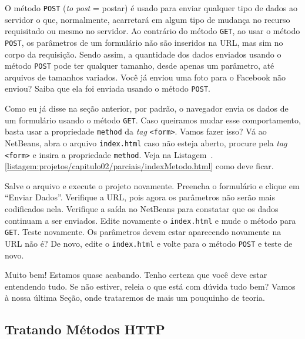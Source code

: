 O método \texttt{POST} (\textit{to post} = postar) é usado para enviar qualquer tipo de dados ao servidor o que, normalmente, acarretará em algum tipo de mudança no recurso requisitado ou mesmo no servidor. Ao contrário do método \texttt{GET}, ao usar o método \texttt{POST}, os parâmetros de um formulário não são inseridos na URL, mas sim no corpo da requisição. Sendo assim, a quantidade dos dados enviados usando o método \texttt{POST} pode ter qualquer tamanho, desde apenas um parâmetro, até arquivos de tamanhos variados. Você já enviou uma foto para o Facebook não enviou? Saiba que ela foi enviada usando o método \texttt{POST}.

Como eu já disse na seção anterior, por padrão, o navegador envia os dados de um formulário usando o método \texttt{GET}. Caso queiramos mudar esse comportamento, basta usar a propriedade \texttt{method} da \textit{tag} \texttt{<form>}. Vamos fazer isso? Vá ao NetBeans, abra o arquivo \texttt{index.html} caso não esteja aberto, procure pela \textit{tag} \texttt{<form>} e insira a propriedade \texttt{method}. Veja na Listagem~\thechapter.\ref{listagem:projetos/capitulo02/parciais/indexMetodo.html} como deve ficar.


Salve o arquivo e execute o projeto novamente. Preencha o formulário e clique em ``Enviar Dados''. Verifique a URL, pois agora os parâmetros não serão mais codificados nela. Verifique a saída no NetBeans para constatar que os dados continuam a ser enviados. Edite novamente o \texttt{index.html} e mude o método para \texttt{GET}. Teste novamente. Os parâmetros devem estar aparecendo novamente na URL não é? De novo, edite o \texttt{index.html} e volte para o método \texttt{POST} e teste de novo.

Muito bem! Estamos quase acabando. Tenho certeza que você deve estar entendendo tudo. Se não estiver, releia o que está com dúvida tudo bem? Vamos à nossa última Seção, onde trataremos de mais um pouquinho de teoria.



\subsection{Tratando Métodos HTTP}

